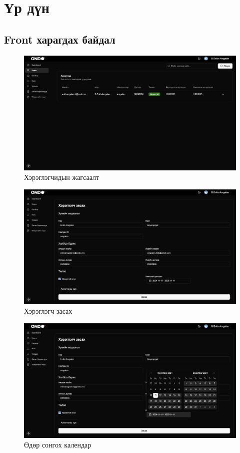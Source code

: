 \section{Үр дүн}
\subsection{Front харагдах байдал}

\begin{figure}
	\centering
	\includegraphics[width=15cm]{images/main.png}
	\caption{Хэрэглэгчидын жагсаалт}
\end{figure}

\begin{figure}
	\centering
	\includegraphics[width=15cm]{images/front.png}
	\caption{Хэрэглэгч засах}
\end{figure}

\begin{figure}
	\centering
	\includegraphics[width=15cm]{images/calendar.png}
	\caption{Өдөр сонгох календар}
\end{figure}

